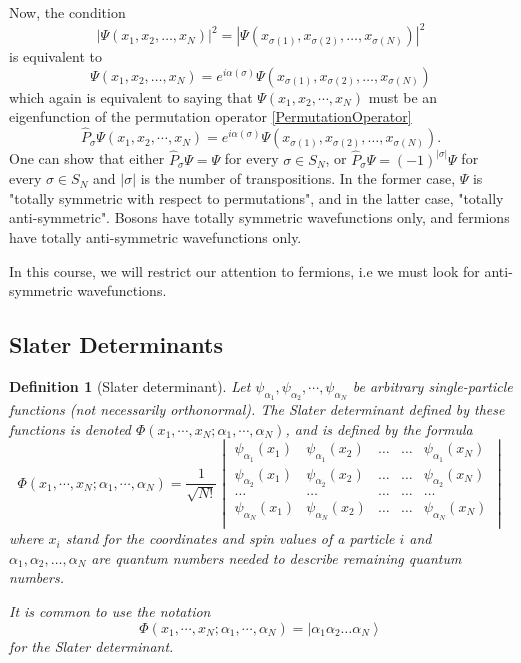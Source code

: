 \documentclass[a4paper,10pt]{article}
\newcommand{\ket}[1]{\left| #1 \right\rangle} \newcommand{\element}[3]
\theoremstyle{definition}
\newtheorem{definition}{Definition}
\begin{document}
Now, the condition
\begin{equation*}
 |\Psi(x_1,x_2,\dots,x_N)|^2 = |\Psi(x_{\sigma(1)},x_{\sigma(2)},\dots,x_{\sigma(N)})|^2 
\end{equation*}
is equivalent to
\begin{equation}
 \Psi(x_1,x_2,\dots,x_N) = e^{i \alpha(\sigma)}\Psi(x_{\sigma(1)},x_{\sigma(2)},\dots,x_{\sigma(N)})
\end{equation}
which again is equivalent to saying that $\Psi(x_1,x_2,\cdots,x_N)$ must be an eigenfunction of 
the permutation operator \ref{PermutationOperator} 
\begin{equation}
 \hat{P}_\sigma \Psi(x_1,x_2,\cdots,x_N) = e^{i \alpha(\sigma)} \Psi(x_{\sigma(1)},x_{\sigma(2)},\dots,x_{\sigma(N)}).
\end{equation}
One can show that either $\hat{P}_\sigma \Psi = \Psi$ for every $\sigma \in S_N$, or $\hat{P}_\sigma \Psi = (-1)^{|\sigma|} \Psi$
for every $\sigma \in S_N$ and $|\sigma|$ is the number of transpositions. 
In the former case, $\Psi$ is "totally symmetric with respect to permutations", and in the latter
case, "totally anti-symmetric". Bosons have totally symmetric wavefunctions only, and fermions have totally
anti-symmetric wavefunctions only.

In this course, we will restrict our attention to fermions, i.e we must look for 
anti-symmetric wavefunctions. 

\subsection{Slater Determinants}
\begin{definition}[Slater determinant]
 Let $\psi_{\alpha_1},\psi_{\alpha_2},\cdots,\psi_{\alpha_N}$ be arbitrary single-particle functions 
 (not necessarily orthonormal). The Slater determinant defined by these functions is denoted 
 $\Phi(x_1,\cdots,x_N; \alpha_1,\cdots,\alpha_N)$, and is defined by the formula
 \begin{equation*}
  \Phi(x_1,\cdots,x_N; \alpha_1,\cdots,\alpha_N) = \frac{1}{\sqrt{N!}}
  \begin{vmatrix}
  \psi_{\alpha_1}(x_1) & \psi_{\alpha_1}(x_2) & \dots & \dots & \psi_{\alpha_1}(x_N) \\ 
  \psi_{\alpha_2}(x_1) & \psi_{\alpha_2}(x_2) & \dots & \dots & \psi_{\alpha_2}(x_N) \\ 
  \dots & \dots & \dots & \dots & \dots \\
  \psi_{\alpha_N}(x_1) & \psi_{\alpha_N}(x_2) & \dots & \dots & \psi_{\alpha_N}(x_N) \\ 
  \end{vmatrix}
 \end{equation*}
 where $x_i$ stand for the coordinates and spin values of a particle $i$ and $\alpha_1,\alpha_2,\dots,\alpha_N$
 are quantum numbers needed to describe remaining quantum numbers. 
 
 It is common to use the notation 
 \begin{equation}
  \Phi(x_1,\cdots,x_N; \alpha_1,\cdots,\alpha_N) = \ket{\alpha_1 \alpha_2 \dots \alpha_N}
 \end{equation} 
 for the Slater determinant.
\end{definition}
\end{document}
